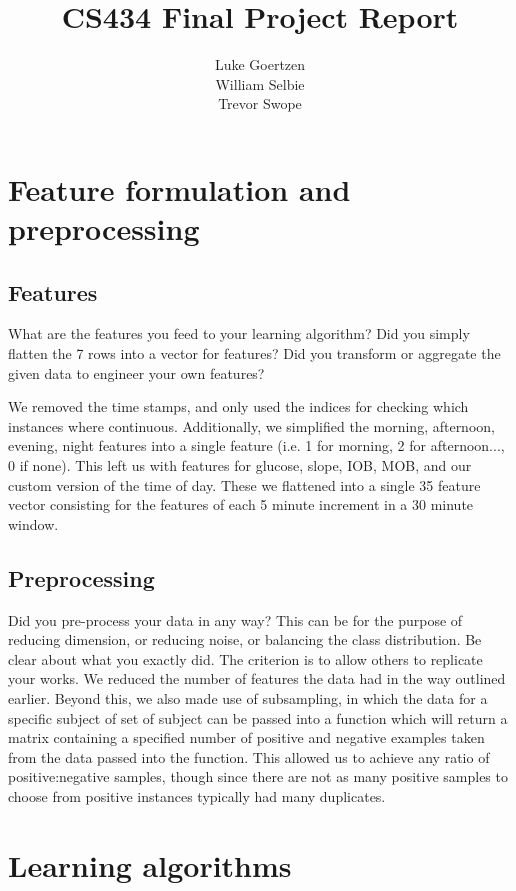 \documentclass[11pt,a4paper]{article}
\title{CS434 Final Project Report}
\author{Luke Goertzen \\ William Selbie \\ Trevor Swope}
\date{}
\begin{document}
\maketitle

\section{Feature formulation and preprocessing}

\subsection{Features} 
What are the features you feed to your learning algorithm? Did you simply flatten the 7 rows into a vector for features? Did you transform or aggregate the given data to engineer your own features?

We removed the time stamps, and only used the indices for checking which instances where continuous. Additionally, we simplified the morning, afternoon, evening, night features into a single feature (i.e. 1 for morning, 2 for afternoon..., 0 if none). This left us with features for  glucose, slope, IOB, MOB, and our custom version of the time of day. These we flattened into a single 35 feature vector consisting for the features of each 5 minute increment in a 30 minute window.


\subsection{Preprocessing}

Did you pre-process your data in any way? This can be for the purpose of reducing dimension, or reducing noise, or balancing the class distribution. Be clear about what you exactly did. The criterion is to allow others to replicate your works.
We reduced the number of features the data had in the way outlined earlier. Beyond this, we also made use of subsampling, in which the data for a specific subject of set of subject can be passed into a function which will return a matrix containing a specified number of positive and negative examples taken from the data passed into the function. This allowed us to achieve any ratio of positive:negative samples, though since there are not as many positive samples to choose from positive instances typically had many duplicates.

\section{Learning algorithms}
\end{document}
